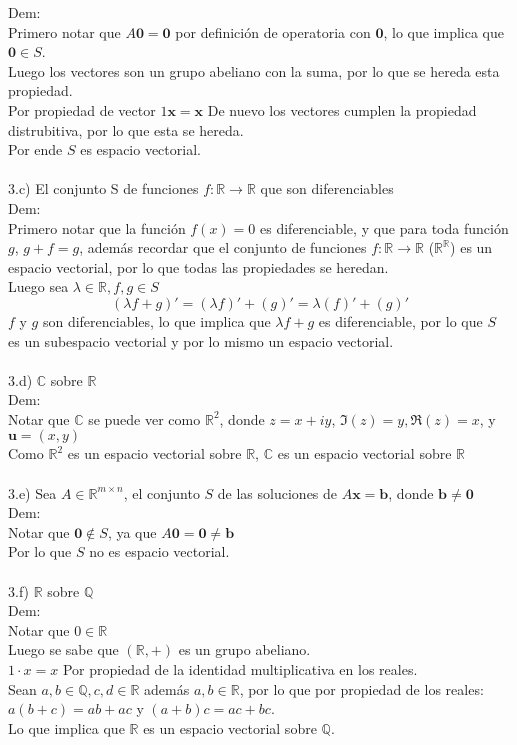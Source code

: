 \documentclass[11pt]{article}
\renewcommand{\vec}[1]{\mathbf{#1}}
\begin{document}
Dem:\\
Primero notar que $A\vec{0}=\vec{0}$ por definición de operatoria con $\vec{0}$, lo que implica que $\vec{0}\in S$.\\
Luego los vectores son un grupo abeliano con la suma, por lo que se hereda esta propiedad.\\
Por propiedad de vector $1\vec{x}=\vec{x}$
De nuevo los vectores cumplen la propiedad distrubitiva, por lo que esta se hereda.\\
Por ende $S$ es espacio vectorial.\\
\\
3.c) El conjunto S de funciones $f:\mathbb{R}\rightarrow\mathbb{R}$ que son diferenciables\\
Dem:\\
Primero notar que la función $f(x)=0$ es diferenciable, y que para toda función $g$, $g+f=g$, además recordar que el conjunto de funciones $f:\mathbb{R}\rightarrow\mathbb{R}$ ($\mathbb{R}^\mathbb{R}$) es un espacio vectorial, por lo que todas las propiedades se heredan.\\
Luego sea $\lambda\in\mathbb{R}, f,g\in S$\\
\[
\left(\lambda f+g\right)'=\left(\lambda f\right)'+\left(g\right)'=\lambda\left( f\right)'+\left(g\right)'
\]
$f$ y $g$ son diferenciables, lo que implica que $\lambda f+g$ es diferenciable, por lo que $S$ es un subespacio vectorial y por lo mismo un espacio vectorial.\\
\\
3.d) $\mathbb{C}$ sobre $\mathbb{R}$\\
Dem:\\
Notar que $\mathbb{C}$ se puede ver como $\mathbb{R}^2$, donde $z=x+iy$, $\Im (z)=y,\Re (z)=x$, y $\vec{u}=(x,y)$\\
Como $\mathbb{R}^2$ es un espacio vectorial sobre $\mathbb{R}$, $\mathbb{C}$ es un espacio vectorial sobre $\mathbb{R}$\\
\\
3.e) Sea $A\in\mathbb{R}^{m\times n}$, el conjunto $S$ de las soluciones de $A\vec{x}=\vec{b}$, donde $\vec{b}\neq\vec{0}$\\
Dem:\\
Notar que $\vec{0}\notin S$, ya que $A\vec{0}=\vec{0}\neq\vec{b}$\\
Por lo que $S$ no es espacio vectorial.\\
\\
3.f) $\mathbb{R}$ sobre $\mathbb{Q}$\\
Dem:\\
Notar que $0\in\mathbb{R}$\\
Luego se sabe que $(\mathbb{R},+)$ es un grupo abeliano.\\
$1\cdot x=x$ Por propiedad de la identidad multiplicativa en los reales.\\
Sean $a,b\in\mathbb{Q},c,d\in\mathbb{R}$ además $a,b\in\mathbb{R}$, por lo que por propiedad de los reales: $a(b+c)=ab+ac$ y $(a+b)c=ac+bc$.\\
Lo que implica que $\mathbb{R}$ es un espacio vectorial sobre $\mathbb{Q}$.\\
\end{document}
